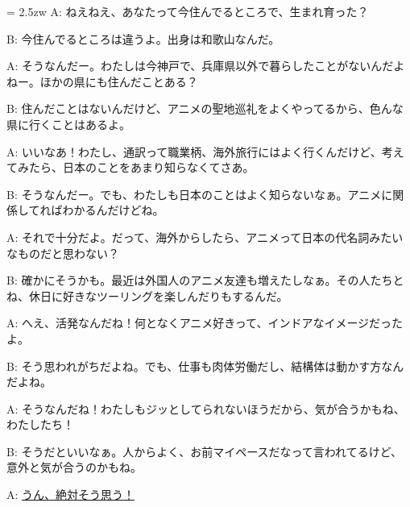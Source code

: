 \documentclass[11pt]{amsart}
\title{}
\author{}
\newenvironment{hangall}[1]{\hangindent = 2.5zw\everypar{\hangindent = 2.5zw}}{}
\begin{document}
\maketitle
\begin{hangall}{}%
A: ねえねえ、あなたって今住んでるところで、生まれ育った？

B: 今住んでるところは違うよ。出身は和歌山なんだ。

A: そうなんだー。わたしは今神戸で、兵庫県以外で暮らしたことがないんだよねー。ほかの県にも住んだことある？

B: 住んだことはないんだけど、アニメの聖地巡礼をよくやってるから、色んな県に行くことはあるよ。

A: いいなあ！わたし、通訳って職業柄、海外旅行にはよく行くんだけど、考えてみたら、日本のことをあまり知らなくてさあ。

B: そうなんだー。でも、わたしも日本のことはよく知らないなぁ。アニメに関係してればわかるんだけどね。

A: それで十分だよ。だって、海外からしたら、アニメって日本の代名詞みたいなものだと思わない？

B: 確かにそうかも。最近は外国人のアニメ友達も増えたしなぁ。その人たちとね、休日に好きなツーリングを楽しんだりもするんだ。

A: へえ、活発なんだね！何となくアニメ好きって、インドアなイメージだったよ。

B: そう思われがちだよね。でも、仕事も肉体労働だし、結構体は動かす方なんだよね。

A: そうなんだね！わたしもジッとしてられないほうだから、気が合うかもね、わたしたち！

B: そうだといいなぁ。人からよく、お前マイペースだなって言われてるけど、意外と気が合うのかもね。

A: \ul{うん、絶対そう思う！}\end{hangall}
\end{document}
